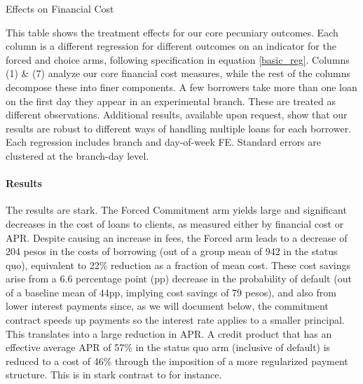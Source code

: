\documentclass[12pt, a4paper]{article}
\begin{document}
\begin{table}
\caption{Effects on Financial Cost}
\label{main_impact_table}
\begin{center}
\resizebox{1.0\textwidth}{!}{
\footnotesize{}
}
\end{center}
\scriptsize{This table shows the treatment effects for our core pecuniary outcomes. Each column is a different regression for different outcomes on an indicator for the forced and choice arms, following specification in equation \ref{basic_reg}. Columns (1) \& (7) analyze our core financial cost measures, while the rest of the columns decompose these into finer components.
A few borrowers take more than one loan on the first day they appear in an experimental branch. These are treated as different observations. Additional results, available upon request, show that our results are robust to different ways of handling multiple loans for each borrower. Each regression includes branch and day-of-week FE. Standard errors are clustered at the branch-day level. }

\end{table}



\paragraph*{Results} The results are stark. The Forced Commitment arm yields large and significant decreases in the cost of loans to clients, as measured either by financial cost or APR. Despite causing an increase in fees, the Forced arm leads to a decrease of 204 pesos in the costs of borrowing (out of a group mean of 942 in the status quo), equivalent to 22\% reduction as a fraction of mean cost. These cost savings arise from a 6.6 percentage point (pp) decrease in the probability of default (out of a baseline mean of 44pp,  implying cost savings of 79 pesos), and also from lower interest payments since, as we will document below, the commitment contract speeds up payments so the interest rate applies to a smaller principal. This translates into a large reduction in APR. A credit product that has an effective average APR of 57\% in the status quo arm (inclusive of default) is reduced to a cost of 46\% through the imposition of a more regularized payment structure. This is in stark contrast to \cite{Pande} for instance.  
\end{document}
